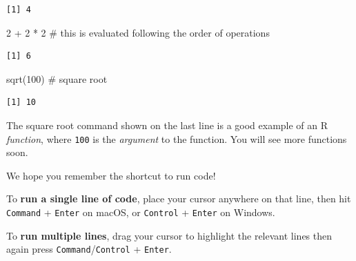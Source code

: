 \documentclass[
  letterpaper,
  DIV=11,
  numbers=noendperiod]{scrreprt}
\newenvironment{Shaded}{\begin{snugshade}}{\end{snugshade}}
\newcommand{\CommentTok}[1]{\textcolor[rgb]{0.37,0.37,0.37}{#1}}
\newcommand{\DecValTok}[1]{\textcolor[rgb]{0.68,0.00,0.00}{#1}}
\newcommand{\FunctionTok}[1]{\textcolor[rgb]{0.28,0.35,0.67}{#1}}
\newcommand{\NormalTok}[1]{\textcolor[rgb]{0.00,0.23,0.31}{#1}}
\newcommand{\SpecialCharTok}[1]{\textcolor[rgb]{0.37,0.37,0.37}{#1}}
\begin{document}
\begin{verbatim}
[1] 4
\end{verbatim}

\begin{Shaded}
\begin{Highlighting}[]
\DecValTok{2} \SpecialCharTok{+} \DecValTok{2} \SpecialCharTok{*} \DecValTok{2}   \CommentTok{\# this is evaluated following the order of operations}
\end{Highlighting}
\end{Shaded}

\begin{verbatim}
[1] 6
\end{verbatim}

\begin{Shaded}
\begin{Highlighting}[]
\FunctionTok{sqrt}\NormalTok{(}\DecValTok{100}\NormalTok{)   }\CommentTok{\# square root}
\end{Highlighting}
\end{Shaded}

\begin{verbatim}
[1] 10
\end{verbatim}

The square root command shown on the last line is a good example of an R
\emph{function}, where \texttt{100} is the \emph{argument} to the
function. You will see more functions soon.

\begin{tcolorbox}[enhanced jigsaw, title=\textcolor{quarto-callout-note-color}{\faInfo}\hspace{0.5em}{Reminder}, colbacktitle=quarto-callout-note-color!10!white, leftrule=.75mm, arc=.35mm, opacityback=0, bottomrule=.15mm, rightrule=.15mm, toptitle=1mm, breakable, toprule=.15mm, colback=white, coltitle=black, colframe=quarto-callout-note-color-frame, bottomtitle=1mm, titlerule=0mm, left=2mm, opacitybacktitle=0.6]

We hope you remember the shortcut to run code!

To \textbf{run a single line of code}, place your cursor anywhere on
that line, then hit \texttt{Command} + \texttt{Enter} on macOS, or
\texttt{Control} + \texttt{Enter} on Windows.

To \textbf{run multiple lines}, drag your cursor to highlight the
relevant lines then again press \texttt{Command}/\texttt{Control} +
\texttt{Enter}.

\end{tcolorbox}
\end{document}
